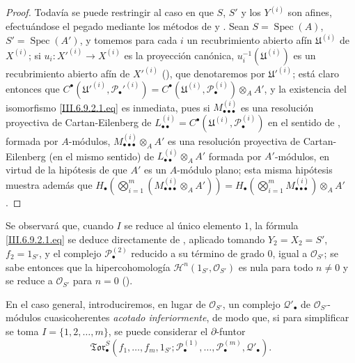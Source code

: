 \begin{proof}
Todavía se puede restringir al caso en que $S$, $S'$ y los $Y^{(i)}$ son
afines, efectuándose el pegado mediante los métodos de  y
. Sean $S=\operatorname{Spec}(A)$,
$S'=\operatorname{Spec}(A')$, y tomemos para cada $i$ un recubrimiento abierto
afín $\mathfrak U^{(i)}$ de $X^{(i)}$; si
$u_i:X'^{(i)}\to X^{(i)}$ es la proyección canónica,
$u_i^{-1}(\mathfrak U^{(i)})$ es un recubrimiento abierto afín de
$X'^{(i)}$ (), que denotaremos por
$\mathfrak U'^{(i)}$; está claro entonces que
$C^\bullet(\mathfrak U'^{(i)},\mathscr P_\bullet'^{(i)})
=C^\bullet(\mathfrak U^{(i)},\mathscr P_\bullet^{(i)})\otimes_A A'$,
y la existencia del isomorfismo \eqref{III.6.9.2.1.eq} es inmediata, pues si
$M_{\bullet\bullet\bullet}^{(i)}$ es una resolución proyectiva de
Cartan-Eilenberg de
$L_{\bullet\bullet}^{(i)}=C^\bullet(\mathfrak U^{(i)},
\mathscr P_\bullet^{(i)})$ en el sentido de , formada por
$A$-módulos, $M_{\bullet\bullet\bullet}^{(i)}\otimes_A A'$ es una resolución
proyectiva de Cartan-Eilenberg (en el mismo sentido) de
$L_{\bullet\bullet}^{(i)}\otimes_A A'$ formada por $A'$-módulos, en virtud
de la hipótesis de que $A'$ es un $A$-módulo plano; esta misma hipótesis
muestra además que
$H_\bullet(\bigotimes_{i=1}^m(M_{\bullet\bullet\bullet}^{(i)}\otimes_A A'))
=H_\bullet(\bigotimes_{i=1}^m M_{\bullet\bullet\bullet}^{(i)})\otimes_A A'$.
\end{proof}


\label{III.6.9.2.2}
Se observará que, cuando $I$ se reduce al único elemento $1$, la fórmula
\eqref{III.6.9.2.1.eq} se deduce directamente de , aplicado
tomando $Y_2=X_2=S'$, $f_2=1_{S'}$, y el complejo
$\mathscr P_\bullet^{(2)}$ reducido a su término de grado $0$, igual a
$\mathscr O_{S'}$; se sabe entonces que la hipercohomología
$\mathscr H^n(1_{S'},\mathscr O_{S'})$ es nula para todo $n\ne0$ y se reduce
a $\mathscr O_{S'}$ para $n=0$ ().


En el caso general, introduciremos, en lugar de $\mathscr O_{S'}$, un
complejo $\mathscr Q'_\bullet$ de $\mathscr O_{S'}$-módulos cuasicoherentes
\emph{acotado inferiormente}, de modo que, si para simplificar se toma
$I=\{1,2,\ldots,m\}$, se puede considerar el $\partial$-funtor
\[
  \mathfrak{Tor}_\bullet^S
  (f_1,\ldots,f_m,1_{S'};
   \mathscr P_\bullet^{(1)},\ldots,\mathscr P_\bullet^{(m)},
   \mathscr Q'_\bullet).
\]


